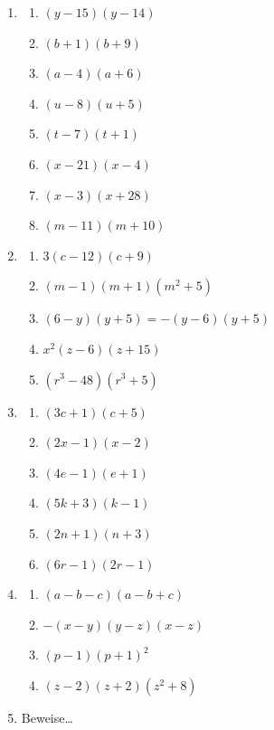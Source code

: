 \begin{enumerate}
    \item
          \begin{enumerate}
              \item \((y-15)(y-14)\)
              \item \((b+1)(b+9)\)
              \item \((a-4)(a+6)\)
              \item \((u-8)(u+5)\)
              \item \((t-7)(t+1)\)
              \item \((x-21)(x-4)\)
              \item \((x-3)(x+28)\)
              \item \((m-11)(m+10)\)
          \end{enumerate}

    \item
          \begin{enumerate}
              \item \(3(c-12)(c+9)\)
              \item \((m-1)(m+1)(m^2+5)\)
              \item \((6-y)(y+5) = -(y-6)(y+5)\)
              \item \(x^2(z-6)(z+15)\)
              \item \((r^3-48)(r^3+5)\)
          \end{enumerate}

    \item
          \begin{enumerate}
              \item \((3c+1)(c+5)\)
              \item \((2x-1)(x-2)\)
              \item \((4e-1)(e+1)\)
              \item \((5k+3)(k-1)\)
              \item \((2n+1)(n+3)\)
              \item \((6r-1)(2r-1)\)
          \end{enumerate}
    \item \begin{enumerate}
              \item \((a-b-c)(a-b+c)\)
              \item \(-(x-y)(y-z)(x-z)\)
              \item \((p-1)(p+1)^2\)
              \item \((z-2)(z+2)(z^2+8)\)
          \end{enumerate}
    \item Beweise\dots
\end{enumerate}



